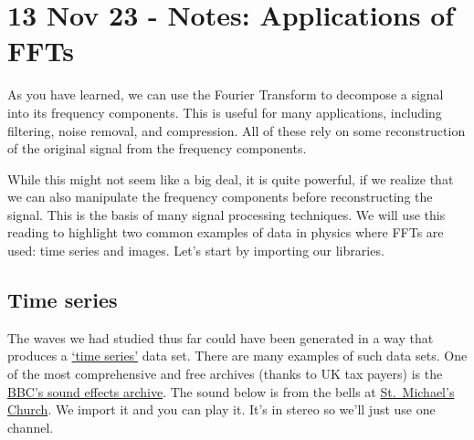 \section{13 Nov 23 - Notes: Applications of
FFTs}\label{nov-23---notes-applications-of-ffts}

As you have learned, we can use the Fourier Transform to decompose a
signal into its frequency components. This is useful for many
applications, including filtering, noise removal, and compression. All
of these rely on some reconstruction of the original signal from the
frequency components.

While this might not seem like a big deal, it is quite powerful, if we
realize that we can also manipulate the frequency components before
reconstructing the signal. This is the basis of many signal processing
techniques. We will use this reading to highlight two common examples of
data in physics where FFTs are used: time series and images. Let's start
by importing our libraries.

\begin{Shaded}
\begin{Highlighting}[]
\end{Highlighting}
\end{Shaded}

\subsection{Time series}\label{time-series}

The waves we had studied thus far could have been generated in a way
that produces a \href{https://en.wikipedia.org/wiki/Time_series}{`time
series'} data set. There are many examples of such data sets. One of the
most comprehensive and free archives (thanks to UK tax payers) is the
\href{https://sound-effects.bbcrewind.co.uk/}{BBC's sound effects
archive}. The sound below is from the bells at
\href{https://sound-effects.bbcrewind.co.uk/search?q=07070175}{St.~Michael's
Church}. We import it and you can play it. It's in stereo so we'll just
use one channel.

